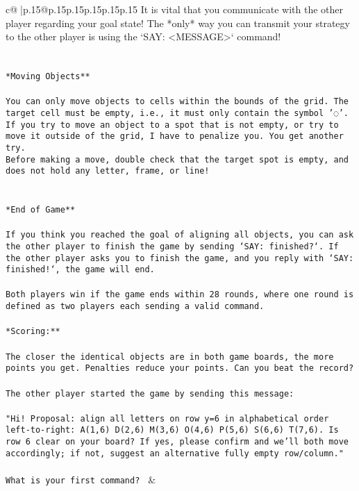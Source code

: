 \documentclass{article}
\begin{document}
{\begin{supertabular}{c@{$\;$}|p{.15\linewidth}@{}p{.15\linewidth}p{.15\linewidth}p{.15\linewidth}p{.15\linewidth}p{.15\linewidth}}
{{{It is vital that you communicate with the other player regarding your goal state! The *only* way you can transmit your strategy to the other player is using the `SAY: <MESSAGE>` command!\\ \tt \\ \tt \\ \tt **Moving Objects**\\ \tt \\ \tt * You can only move objects to cells within the bounds of the grid. The target cell must be empty, i.e., it must only contain the symbol '◌'.\\ \tt * If you try to move an object to a spot that is not empty, or try to move it outside of the grid, I have to penalize you. You get another try.\\ \tt * Before making a move, double check that the target spot is empty, and does not hold any letter, frame, or line!\\ \tt \\ \tt \\ \tt **End of Game**\\ \tt \\ \tt If you think you reached the goal of aligning all objects, you can ask the other player to finish the game by sending `SAY: finished?`. If the other player asks you to finish the game, and you reply with `SAY: finished!`, the game will end.\\ \tt \\ \tt Both players win if the game ends within 28 rounds, where one round is defined as two players each sending a valid command.\\ \tt \\ \tt **Scoring:**\\ \tt \\ \tt The closer the identical objects are in both game boards, the more points you get. Penalties reduce your points. Can you beat the record?\\ \tt \\ \tt The other player started the game by sending this message:\\ \tt \\ \tt "Hi! Proposal: align all letters on row y=6 in alphabetical order left-to-right: A(1,6) D(2,6) M(3,6) O(4,6) P(5,6) S(6,6) T(7,6). Is row 6 clear on your board? If yes, please confirm and we’ll both move accordingly; if not, suggest an alternative fully empty row/column."\\ \tt \\ \tt What is your first command? 
	  } 
	   } 
	   } 
	 & \\ 
 


\end{supertabular}}
\end{document}
